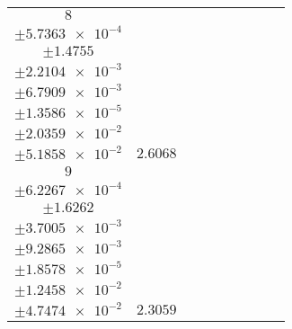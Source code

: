 \documentclass[8pt]{article}
\begin{document}
\begin{longtable}[l]{c c c c c c c c c}
$\num{8}$ & \begin{tabular}[c]{@{}c@{}}$\num{3.3261e-2}$ \\ $\pm\num{5.7363e-4}$\end{tabular} & \begin{tabular}[c]{@{}c@{}}$\num{0.27456}$ \\ $\pm\num{1.4755}$\end{tabular} & \begin{tabular}[c]{@{}c@{}}$\num{-7.0877}$ \\ $\pm\num{2.2104e-3}$\end{tabular} & \begin{tabular}[c]{@{}c@{}}$\num{1.4312e+3}$ \\ $\pm\num{6.7909e-3}$\end{tabular} & \begin{tabular}[c]{@{}c@{}}$\num{2.8632}$ \\ $\pm\num{1.3586e-5}$\end{tabular} & \begin{tabular}[c]{@{}c@{}}$\num{1.2307}$ \\ $\pm\num{2.0359e-2}$\end{tabular} & \begin{tabular}[c]{@{}c@{}}$\num{4.2452}$ \\ $\pm\num{5.1858e-2}$\end{tabular} & $\num{2.6068}$\\
$\num{9}$ & \begin{tabular}[c]{@{}c@{}}$\num{2.8041e-2}$ \\ $\pm\num{6.2267e-4}$\end{tabular} & \begin{tabular}[c]{@{}c@{}}$\num{0.24084}$ \\ $\pm\num{1.6262}$\end{tabular} & \begin{tabular}[c]{@{}c@{}}$\num{-6.8002}$ \\ $\pm\num{3.7005e-3}$\end{tabular} & \begin{tabular}[c]{@{}c@{}}$\num{1.4317e+3}$ \\ $\pm\num{9.2865e-3}$\end{tabular} & \begin{tabular}[c]{@{}c@{}}$\num{2.8641}$ \\ $\pm\num{1.8578e-5}$\end{tabular} & \begin{tabular}[c]{@{}c@{}}$\num{1.1265}$ \\ $\pm\num{1.2458e-2}$\end{tabular} & \begin{tabular}[c]{@{}c@{}}$\num{4.1573}$ \\ $\pm\num{4.7474e-2}$\end{tabular} & $\num{2.3059}$\\

\end{longtable}
\end{document}
